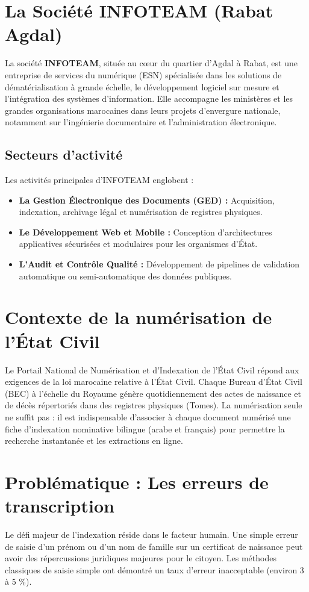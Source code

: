 \documentclass[12pt,a4paper,oneside]{report}
\begin{document}
\section{La Société INFOTEAM (Rabat Agdal)}
La société \textbf{INFOTEAM}, située au cœur du quartier d'Agdal à Rabat, est une entreprise de services du numérique (ESN) spécialisée dans les solutions de dématérialisation à grande échelle, le développement logiciel sur mesure et l'intégration des systèmes d'information. Elle accompagne les ministères et les grandes organisations marocaines dans leurs projets d'envergure nationale, notamment sur l'ingénierie documentaire et l'administration électronique.

\subsection{Secteurs d'activité}
Les activités principales d'INFOTEAM englobent :
\begin{itemize}
    \item \textbf{La Gestion Électronique des Documents (GED) :} Acquisition, indexation, archivage légal et numérisation de registres physiques.
    \item \textbf{Le Développement Web et Mobile :} Conception d'architectures applicatives sécurisées et modulaires pour les organismes d'État.
    \item \textbf{L'Audit et Contrôle Qualité :} Développement de pipelines de validation automatique ou semi-automatique des données publiques.
\end{itemize}

\section{Contexte de la numérisation de l'État Civil}
Le Portail National de Numérisation et d'Indexation de l'État Civil répond aux exigences de la loi marocaine relative à l'État Civil. Chaque Bureau d'État Civil (BEC) à l'échelle du Royaume génère quotidiennement des actes de naissance et de décès répertoriés dans des registres physiques (Tomes). La numérisation seule ne suffit pas : il est indispensable d'associer à chaque document numérisé une fiche d'indexation nominative bilingue (arabe et français) pour permettre la recherche instantanée et les extractions en ligne.

\section{Problématique : Les erreurs de transcription}
Le défi majeur de l'indexation réside dans le facteur humain. Une simple erreur de saisie d'un prénom ou d'un nom de famille sur un certificat de naissance peut avoir des répercussions juridiques majeures pour le citoyen. Les méthodes classiques de saisie simple ont démontré un taux d'erreur inacceptable (environ 3 à 5 \%). 
\end{document}

